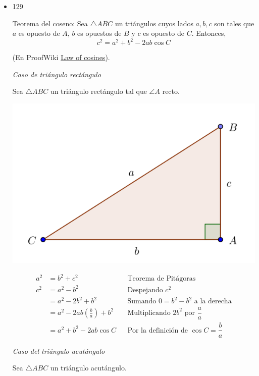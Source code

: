 \documentclass[11pt]{article}
\begin{document}
\begin{itemize}
\item 129
\begin{teorema}
Teorema del coseno: Sea \(\triangle ABC\) un triángulos cuyos lados
\(a, b, c\) son tales que \(a\) es opuesto de \(A\), \(b\) es opuestos de \(B\)
y \(c\) es opuesto de \(C\). Entonces,
$$c^2 = a^2 + b^2 - 2 a b \cos C$$
\end{teorema}
\begin{demostracion}
(En ProofWiki \href{https://proofwiki.org/wiki/Law\_of\_Cosines}{Law of cosines}).

\emph{Caso de triángulo rectángulo}

Sea \(\triangle ABC\) un triángulo rectángulo tal que \(\angle A\) recto.

\begin{center}
\includegraphics[width=.9\linewidth]{./fig/teorema-coseno-1.png}
\end{center}

\begin{align*}
a^2 &= b^2 + c^2
    && \text{Teorema de Pitágoras} \\
c^2 &= a^2 - b^2
    && \text{Despejando $c^{2}$}\\
    &= a^2 - 2 b^2 + b^2
    && \text{Sumando $0 = b^2 - b^2$ a la derecha} \\
    &= a^2 - 2 a b \left({\frac b a}\right) + b^2
    && \text{Multiplicando $2 b^2$ por $\dfrac a a$} \\
    &= a^2 + b^2 - 2 a b \cos C
    && \text{Por la definición de $\cos C = \dfrac b a$}
\end{align*}


\emph{Caso del triángulo acutángulo}

Sea \(\triangle ABC\) un triángulo acutángulo.


\end{demostracion}
\end{itemize}
\end{document}
